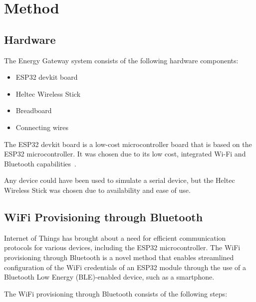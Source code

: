 \section{Method}\label{sec:method}

\subsection{Hardware}

The Energy Gateway system consists of the following hardware components:

\begin{itemize}
  \item ESP32 devkit board
  \item Heltec Wireless Stick
  \item Breadboard
  \item Connecting wires
\end{itemize}

The ESP32 devkit board is a low-cost microcontroller board that is based on the ESP32 microcontroller. It was chosen due to its low cost, integrated Wi-Fi and Bluetooth capabilities~\cite{platformio:esp32-devkitv1}.

Any device could have been used to simulate a serial device, but the Heltec Wireless Stick was chosen due to availability and ease of use.

\subsection{WiFi Provisioning through Bluetooth}

Internet of Things has brought about a need for efficient communication protocols for various devices, including the ESP32 microcontroller. The WiFi provisioning through Bluetooth is a novel method that enables streamlined configuration of the WiFi credentials of an ESP32 module through the use of a Bluetooth Low Energy (BLE)-enabled device, such as a smartphone.

The WiFi provisioning through Bluetooth consists of the following steps:

